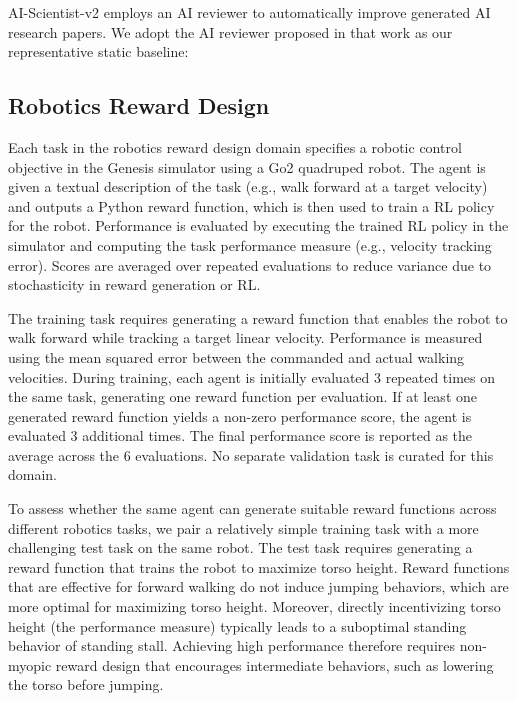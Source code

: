 \documentclass{article}
\begin{document}
AI-Scientist-v2 \citep{yamada2025ai} employs an AI reviewer to automatically improve generated AI research papers. We adopt the AI reviewer proposed in that work as our representative static baseline:


\subsection{Robotics Reward Design}
\label{app:domain-genesis}

Each task in the robotics reward design domain specifies a robotic control objective in the Genesis simulator \citep{genesis2024} using a Go2 quadruped robot. The agent is given a textual description of the task (e.g., walk forward at a target velocity) and outputs a Python reward function, which is then used to train a RL policy \citep[i.e., PPO,][]{schulman2017proximal} for the robot. Performance is evaluated by executing the trained RL policy in the simulator and computing the task performance measure (e.g., velocity tracking error). Scores are averaged over repeated evaluations to reduce variance due to stochasticity in reward generation or RL.

The training task requires generating a reward function that enables the robot to walk forward while tracking a target linear velocity. Performance is measured using the mean squared error between the commanded and actual walking velocities. During training, each agent is initially evaluated 3 repeated times on the same task, generating one reward function per evaluation. If at least one generated reward function yields a non-zero performance score, the agent is evaluated 3 additional times. The final performance score is reported as the average across the 6 evaluations. No separate validation task is curated for this domain.

To assess whether the same agent can generate suitable reward functions across different robotics tasks, we pair a relatively simple training task with a more challenging test task on the same robot. The test task requires generating a reward function that trains the robot to maximize torso height. Reward functions that are effective for forward walking do not induce jumping behaviors, which are more optimal for maximizing torso height. Moreover, directly incentivizing torso height (the performance measure) typically leads to a suboptimal standing behavior of standing stall. Achieving high performance therefore requires non-myopic reward design that encourages intermediate behaviors, such as lowering the torso before jumping.
\end{document}
